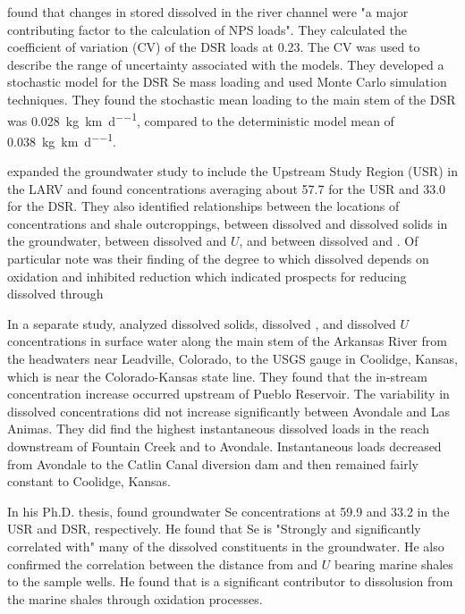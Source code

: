 \textcite{Mueller2008} found that changes in stored dissolved \Se in the river channel were "a major contributing factor to the calculation of NPS loads".  They calculated the coefficient of variation (CV) of the DSR \Se loads at 0.23.  The CV was used to describe the range of uncertainty associated with the models.  They developed a stochastic model for the DSR Se mass loading and used Monte Carlo simulation techniques.  They found the stochastic mean \Se loading to the main stem of the DSR was \SI{0.028}{\kilo\g\per\kilo\m\per\day}, compared to the deterministic model mean of \SI{0.038}{\kilo\g\per\kilo\m\per\day}.

\textcite{gates2009} expanded the \Se groundwater study to include the Upstream Study Region (USR) in the LARV and found concentrations averaging about \SI{57.7}{\mgl} for the USR and \SI{33.0}{\mgl} for the DSR.  They also identified relationships between the locations of \Se concentrations and shale outcroppings, between dissolved \Se and dissolved solids in the groundwater, between dissolved \Se and $ U $, and between dissolved \Se and \nitrate.  Of particular note was their finding of the degree to which dissolved \Se depends on oxidation and inhibited reduction which indicated prospects for reducing dissolved \Se through 

In a separate study, \textcite{Miller2010} analyzed dissolved solids, dissolved \Se, and dissolved $ U $ concentrations in surface water along the main stem of the Arkansas River from the headwaters near Leadville, Colorado, to the USGS gauge in Coolidge, Kansas, which is near the Colorado-Kansas state line.  They found that the in-stream \Se concentration increase occurred upstream of Pueblo Reservoir.  The variability in dissolved \Se concentrations did not increase significantly between Avondale and Las Animas.  They did find the highest instantaneous dissolved \Se loads in the reach downstream of Fountain Creek and to Avondale.  Instantaneous loads decreased from Avondale to the Catlin Canal diversion dam and then remained fairly constant to Coolidge, Kansas.

In his Ph.D. thesis, \textcite{2010Cody} found groundwater Se concentrations at \SI{59.9}{\mgl} and \SI{33.2}{\mgl} in the USR and DSR, respectively.  He found that Se is "Strongly and significantly correlated with" many of the dissolved constituents in the groundwater.  He also confirmed the correlation between the distance from \Se and $ U $ bearing marine shales to the sample wells.  He found that \nitrate is a significant contributor to \Se dissolusion from the marine shales through oxidation processes.

